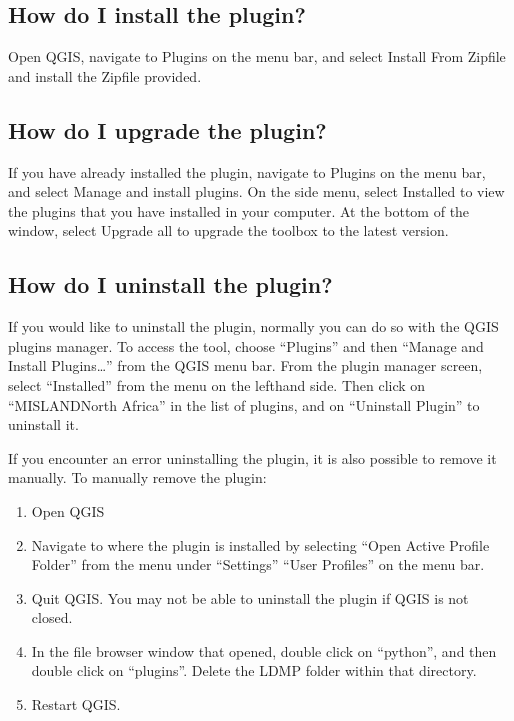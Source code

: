 \documentclass[letterpaper,10pt,english]{sphinxmanual}
\begin{document}
\subsection{How do I install the plugin?}
\label{\detokenize{Introduction/faq:how-do-i-install-the-plugin}}
\sphinxAtStartPar
Open QGIS, navigate to Plugins on the menu bar, and select Install From Zipfile and
install the Zipfile provided.


\subsection{How do I upgrade the plugin?}
\label{\detokenize{Introduction/faq:how-do-i-upgrade-the-plugin}}
\sphinxAtStartPar
If you have already installed the plugin, navigate to Plugins on the menu bar,
and select Manage and install plugins. On the side menu, select Installed to
view the plugins that you have installed in your computer. At the bottom of the
window, select Upgrade all to upgrade the toolbox to the latest version.


\subsection{How do I uninstall the plugin?}
\label{\detokenize{Introduction/faq:how-do-i-uninstall-the-plugin}}
\sphinxAtStartPar
If you would like to uninstall the plugin, normally you can do so with the QGIS
plugins manager. To access the tool, choose “Plugins” and then “Manage and
Install Plugins…” from the QGIS menu bar. From the plugin manager screen,
select “Installed” from the menu on the left\sphinxhyphen{}hand side. Then click on
“MISLAND\sphinxhyphen{}North Africa” in the list of plugins, and on “Uninstall Plugin” to uninstall
it.

\sphinxAtStartPar
If you encounter an error uninstalling the plugin, it is also possible to
remove it manually. To manually remove the plugin:
\begin{enumerate}
%
\item {} 
\sphinxAtStartPar
Open QGIS

\item {} 
\sphinxAtStartPar
Navigate to where the plugin is installed by selecting “Open Active Profile
Folder” from the menu under “Settings” \sphinxhyphen{} “User Profiles” on the menu bar.

\item {} 
\sphinxAtStartPar
Quit QGIS. You may not be able to uninstall the plugin if QGIS is not
closed.

\item {} 
\sphinxAtStartPar
In the file browser window that opened, double click on “python”, and then
double click on “plugins”. Delete the LDMP folder within that directory.

\item {} 
\sphinxAtStartPar
Restart QGIS.

\end{enumerate}
\end{document}
